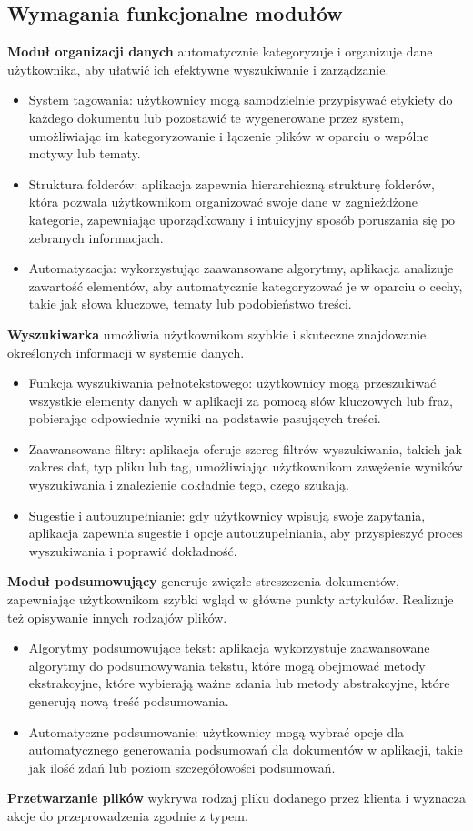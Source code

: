 \documentclass[12pt,a4paper,twoside]{article}
\begin{document}
\subsection{Wymagania funkcjonalne modułów}
\textbf{Moduł organizacji danych} automatycznie kategoryzuje i organizuje dane użytkownika, aby ułatwić ich efektywne wyszukiwanie i zarządzanie.
\begin{itemize}
	\item System tagowania: użytkownicy mogą samodzielnie przypisywać etykiety do każdego dokumentu lub pozostawić te wygenerowane przez system, umożliwiając im kategoryzowanie i łączenie plików w oparciu o wspólne motywy lub tematy.
	\item Struktura folderów: aplikacja zapewnia hierarchiczną strukturę folderów, która pozwala użytkownikom organizować swoje dane w zagnieżdżone kategorie, zapewniając uporządkowany i intuicyjny sposób poruszania się po zebranych informacjach.
	\item Automatyzacja: wykorzystując zaawansowane algorytmy, aplikacja analizuje zawartość elementów, aby automatycznie kategoryzować je w oparciu o cechy, takie jak słowa kluczowe, tematy lub podobieństwo treści.
\end{itemize}\par
\textbf{Wyszukiwarka} umożliwia użytkownikom szybkie i skuteczne znajdowanie określonych informacji w systemie danych.
\begin{itemize}
	\item Funkcja wyszukiwania pełnotekstowego: użytkownicy mogą przeszukiwać wszystkie elementy danych w aplikacji za pomocą słów kluczowych lub fraz, pobierając odpowiednie wyniki na podstawie pasujących treści.
	\item Zaawansowane filtry: aplikacja oferuje szereg filtrów wyszukiwania, takich jak zakres dat, typ pliku lub tag, umożliwiając użytkownikom zawężenie wyników wyszukiwania i znalezienie dokładnie tego, czego szukają.
	\item Sugestie i autouzupełnianie: gdy użytkownicy wpisują swoje zapytania, aplikacja zapewnia sugestie i opcje autouzupełniania, aby przyspieszyć proces wyszukiwania i poprawić dokładność.
\end{itemize}\par
\textbf{Moduł podsumowujący} generuje zwięzłe streszczenia dokumentów, zapewniając użytkownikom szybki wgląd w główne punkty artykułów. Realizuje też opisywanie innych rodzajów plików.
\begin{itemize}
	\item Algorytmy podsumowujące tekst: aplikacja wykorzystuje zaawansowane algorytmy do podsumowywania tekstu, które mogą obejmować metody ekstrakcyjne, które wybierają ważne zdania lub metody abstrakcyjne, które generują nową treść podsumowania.
	\item Automatyczne podsumowanie: użytkownicy mogą wybrać opcje dla automatycznego generowania podsumowań dla dokumentów w aplikacji, takie jak ilość zdań lub poziom szczegółowości podsumowań.
\end{itemize}\par
\textbf{Przetwarzanie plików} wykrywa rodzaj pliku dodanego przez klienta i wyznacza akcje do przeprowadzenia zgodnie z typem.
\newpage
\end{document}
